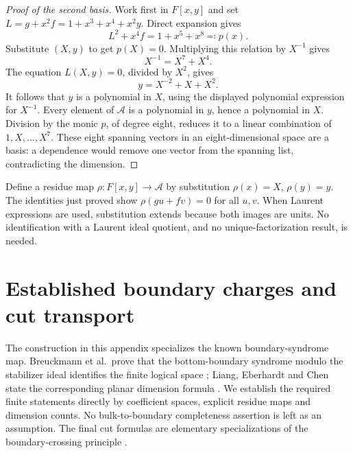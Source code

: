 \documentclass{article}
\begin{document}
\begin{proof}[Proof of the second basis]
  Work first in \(F[x,y]\) and set
  \(L = g + x^2 f = 1 + x^3 + x^4 + x^2 y\). Direct expansion gives
  \begin{equation}
    L^2 + x^4 f = 1 + x^5 + x^8 \eqqcolon p(x).
  \end{equation}
  Substitute \((X,y)\) to get \(p(X) = 0\). Multiplying this relation by
  \(X^{-1}\) gives
  \begin{equation}
    X^{-1} = X^7 + X^4.
  \end{equation}
  The equation \(L(X,y) = 0\), divided by \(X^2\), gives
  \begin{equation}
    y = X^{-2} + X + X^2.
  \end{equation}
  It follows that \(y\) is a polynomial in \(X\), using the displayed polynomial
  expression for \(X^{-1}\). Every element of \(\mathcal{A}\) is a polynomial in
  \(y\), hence a polynomial in \(X\). Division by the monic \(p\), of degree
  eight, reduces it to a linear combination of \(1, X, \dots, X^7\).
  These eight spanning vectors in an eight-dimensional space are a basis:
  a dependence would remove one vector from the spanning list, contradicting
  the dimension.
\end{proof}

Define a residue map \(\rho \colon F[x,y] \to \mathcal{A}\) by substitution
\(\rho(x) = X\), \(\rho(y) = y\). The identities just proved show
\(\rho(gu + fv) = 0\) for all \(u, v\). When Laurent expressions are used, substitution
extends because both images are units. No identification with a Laurent
ideal quotient, and no unique-factorization result, is needed.

\section{Established boundary charges and cut transport}\label{app:boundary}

The construction in this appendix specializes the known boundary-syndrome
map. Breuckmann et al.\ prove that the bottom-boundary syndrome modulo the
stabilizer ideal identifies the finite logical space
\cite[Section~4.3, Theorem~3]{tile2025}; Liang, Eberhardt and Chen state the
corresponding planar dimension formula \cite[Section~III.2, equation~(6)]{liang2025}.
We establish the required finite statements directly by coefficient
spaces, explicit residue maps and dimension counts. No bulk-to-boundary
completeness assertion is left as an assumption. The final cut formulas
are elementary specializations of the boundary-crossing principle
\cite[Statement~7 and Appendix~H]{wang2026}.
\end{document}

